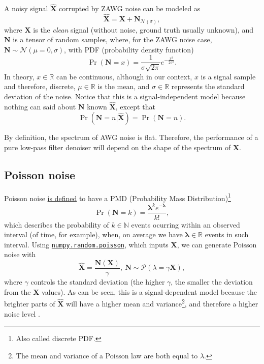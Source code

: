 \documentclass{article}
\begin{document}
A noisy signal $\hat{\mathbf X}$ corrupted by ZAWG noise can be modeled as
\begin{equation}
  \hat{\mathbf X} = {\mathbf X} + {\mathbf N}_{{\mathcal N}(\sigma)},
  \label{eq:AWG_noise_model}  
\end{equation}
where $\mathbf{X}$ is the \emph{clean} signal (without noise, ground
truth usually unknown),
and ${\mathbf N}$ is a tensor of random samples,
where, for the ZAWG noise case,
${\mathbf N}\sim{\mathcal N}(\mu=0,\sigma)$, with PDF (probability density
function)
\begin{equation}
  \Pr({\mathbf N}{=}x) = \frac 1 {\sigma\sqrt{2\pi}} e^{-\frac{x^2}{2\sigma^2} }.
\end{equation}
In theory, $x\in\mathbb{R}$ can be continuous, although in our
context, $x$ is a signal sample and therefore, discrete,
$\mu\in\mathbb{R}$ is the mean, and $\sigma\in\mathbb{R}$ represents
the standard deviation of the noise. Notice that this is a
signal-independent model because nothing can said about ${\mathbf N}$
known $\hat{\mathbf X}$, except that
\begin{equation}
  \Pr(\mathbf{N}{=}n|\hat{\mathbf{X}}) = \Pr(\mathbf{N}{=}n).
\end{equation}

By definition, the spectrum of AWG noise is flat. Therefore, the
performance of a pure low-pass filter denoiser will depend on the
shape of the spectrum of $\mathbf{X}$.


\subsection{Poisson noise}

Poisson noise
\href{https://en.wikipedia.org/wiki/Poisson_distribution}{is defined}
to have a PMD (Probability Mass Distribution)\footnote{Also called
  discrete PDF.}
\begin{equation}
  \Pr({\mathbf N}{=}k) = \frac{\mathbf{\lambda}^ke^{-\mathbf{\lambda}}}{k!},
  \label{eq:PN}
\end{equation}
which describes the probability of $k\in\mathbb{N}$ events ocurring
within an observed interval (of time, for example), when, on average
we have ${\mathbf \lambda}\in\mathbb{R}$ events in such
interval. Using
\href{https://numpy.org/doc/stable/reference/random/generated/numpy.random.poisson.html#numpy-random-poisson}{\texttt{numpy.random.poisson}},
which inputs $\mathbf{X}$, we can generate Poisson noise with
\begin{equation}
  \hat{\mathbf{X}} = \frac{\mathbf{N}(\mathbf{X})}{\gamma},~\mathbf{N}\sim\mathcal{P}(\lambda=\gamma\mathbf{X}),
\end{equation}
where $\gamma$ controls the standard deviation (the higher $\gamma$,
the smaller the deviation from the $\mathbf{X}$ values). As can be
seen, this is a signal-dependent model because the brighter parts of
$\hat{\mathbf X}$ will have a higher mean and variance\footnote{The
  mean and variance of a Poisson law are both equal to $\lambda$.},
and therefore a higher noise level \cite{meiniel2018denoising}.
\end{document}
